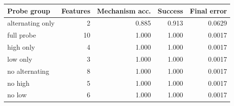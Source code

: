 \begin{tabular}{lrrrr}
\toprule
Probe group & Features & Mechanism acc. & Success & Final error \\
\midrule
alternating only & 2 & 0.885 & 0.913 & 0.0629 \\
full probe & 10 & 1.000 & 1.000 & 0.0017 \\
high only & 4 & 1.000 & 1.000 & 0.0017 \\
low only & 3 & 1.000 & 1.000 & 0.0017 \\
no alternating & 8 & 1.000 & 1.000 & 0.0017 \\
no high & 5 & 1.000 & 1.000 & 0.0017 \\
no low & 6 & 1.000 & 1.000 & 0.0017 \\
\bottomrule
\end{tabular}
